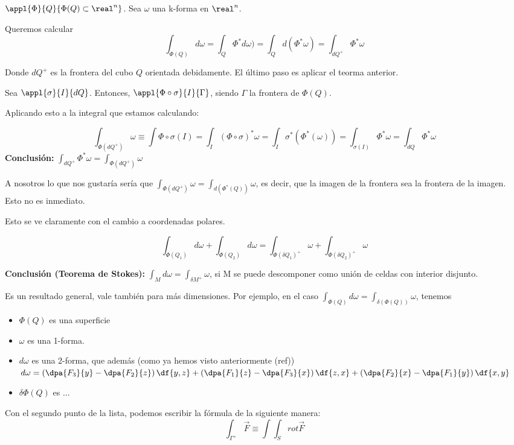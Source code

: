 
$\appl{\Phi}{Q}{\Phi(Q)\subset\real^n}$. Sea $\omega$ una k-forma en $\real^n$.

Queremos calcular \[
\int_{\Phi(Q)} d\omega = \int_Q \Phi^{\ast}d\omega) = \int_Q d(\Phi^{\ast}\omega) = \int_{dQ^{+}} \Phi^{\ast}\omega
\]

Donde $dQ^{+}$ es la frontera del cubo $Q$ orientada debidamente. El último paso es aplicar el teorma anterior.

Sea $\appl{\sigma}{I}{dQ}$. Entonces, $\appl{\Phi\circ\sigma}{I}{\Gamma}$, siendo $\Gamma$ la frontera de $\Phi(Q)$.

Aplicando esto a la integral que estamos calculando:

\[
\int_{\Phi(dQ^{+})} \omega \equiv \int{\Phi\circ\sigma(I)} = \int_I (\Phi\circ\sigma)^{\ast} \omega = \int_I \sigma^{\ast}\left(\Phi^{\ast}(\omega)\right) = \int_{\sigma(I)} \Phi^{\ast}\omega = \int_{dQ}\Phi^{\ast}\omega
\]
\textbf{Conclusión:} $\displaystyle \int_{dQ^+} \Phi^{\ast} \omega = \int_{\Phi(dQ^+)} \omega$


A nosotros lo que nos gustaría sería que $\displaystyle\int_{\Phi(dQ^+)} \omega = \int_{d(\Phi^{\ast}(Q))} \omega$, es decir, que la imagen de la frontera sea la frontera de la imagen. Esto no es inmediato.

Esto se ve claramente con el cambio a coordenadas polares.

\[
\int_{\Phi(Q_1)}d\omega + \int_{\Phi(Q_2)}d\omega=
\int_{\Phi(\delta Q_1)^+}\omega+\int_{\Phi(\delta Q_2)^+}\omega
\]

\textbf{Conclusión (Teorema de Stokes):} $\displaystyle\int_M d\omega = \int_{\delta M^+}\omega$, si M se puede descomponer como unión de celdas con interior disjunto.

\obs Es un resultado general, vale también para más dimensiones. Por ejemplo, en el caso $\displaystyle \int_{\Phi(Q)} d\omega = \int_{\delta(\Phi(Q))} \omega$, tenemos
\begin{itemize}
\item $\Phi(Q)$ es una superficie
\item $\omega$ es una 1-forma.
\item $d\omega$ es una 2-forma, que además (como ya hemos visto anteriormente (ref)) $d\omega = \left(\dpa{F_3}{y}-\dpa{F_2}{z}\right) \df{y,z} + 
\left(\dpa{F_1}{z}-\dpa{F_3}{x}\right) \df{z,x} + 
\left(\dpa{F_2}{x}-\dpa{F_1}{y}\right) \df{x,y}$
\item $\delta\Phi(Q)$ es ... 
\end{itemize} 
Con el segundo punto de la lista, podemos escribir la fórmula de la siguiente manera:
\[
\int_{\Gamma^+} \overrightarrow{F} \equiv \int \int_S rot \overrightarrow{F}
\]

